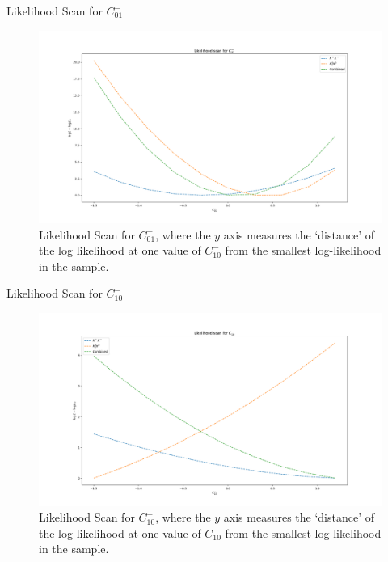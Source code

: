 \begin{frame}{Likelihood Scan for $C_{01}^{-}$}
\begin{figure}
    \centering
        \includegraphics[width=\textwidth]{2020_04_23/figs/M01_Norm.png}
    \caption{Likelihood Scan for $C_{01}^{-}$, where the $y$ axis measures the `distance' of the log likelihood at one value of $C_{10}^{-}$ from the smallest log-likelihood in the sample.}
    \label{fig:scanCM01}
\end{figure}
\end{frame}

\begin{frame}{Likelihood Scan for $C_{10}^{-}$}
\begin{figure}
    \centering
        \includegraphics[width=\textwidth]{2020_04_23/figs/M10_Norm.png}
    \caption{Likelihood Scan for $C_{10}^{-}$, where the $y$ axis measures the `distance' of the log likelihood at one value of $C_{10}^{-}$ from the smallest log-likelihood in the sample.}
    \label{fig:scanCM10}
\end{figure}
\end{frame}

